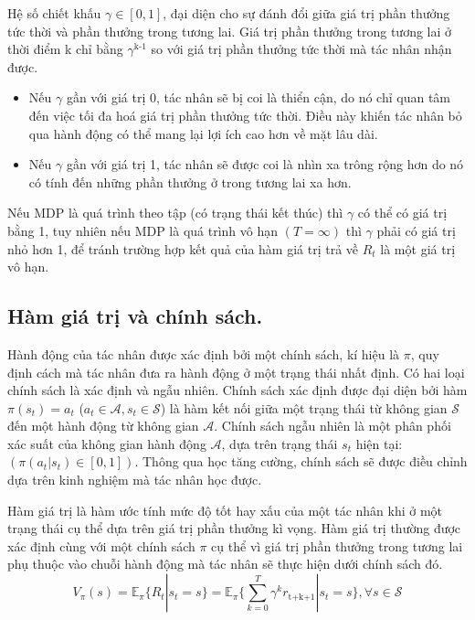 \documentclass{uetgraduation}
\begin{document}
Hệ số chiết khấu $\gamma \in [0, 1]$, đại diện cho sự đánh đổi giữa giá trị phần thưởng tức thời và phần thưởng trong tương lai. Giá trị phần thưởng trong tương lai ở thời điểm k chỉ bằng $\gamma^\text{k-1}$
so với giá trị phần thưởng tức thời mà tác nhân nhận được.
\begin{itemize}
    \item Nếu $\gamma$ gần với giá trị 0, tác nhân sẽ bị coi là thiển cận, do nó chỉ quan tâm đến việc tối đa hoá giá trị phần thưởng tức thời. Điều này khiến tác nhân bỏ qua hành động có thể mang lại lợi ích 
    cao hơn về mặt lâu dài.
    \item Nếu $\gamma$ gần với giá trị 1, tác nhân sẽ được coi là nhìn xa trông rộng hơn do nó có tính đến những phần thưởng ở trong tương lai xa hơn.
\end{itemize}

Nếu MDP là quá trình theo tập (có trạng thái kết thúc) thì $\gamma$ có thể có giá trị bằng 1, tuy nhiên nếu MDP là quá trình vô hạn $(T = \infty)$ thì $\gamma$ phải có giá trị nhỏ hơn 1, để tránh trường
hợp kết quả của hàm giá trị trả về $R_t$ là một giá trị vô hạn.

\subsection{Hàm giá trị và chính sách.}
Hành động của tác nhân được xác định bởi một chính sách, kí hiệu là $\pi$, quy định cách mà tác nhân đưa ra hành động ở một trạng thái nhất định. Có hai loại chính sách là xác định và ngẫu nhiên. Chính sách xác định được
đại diện bởi hàm $\pi(s_t) = a_t$ ($a_t \in \mathcal{A}, s_t \in \mathcal{S}$) là hàm kết nối giữa một trạng thái từ không gian $\mathcal{S}$ đến một hành động từ không gian $\mathcal{A}$. Chính sách
ngẫu nhiên là một phân phối xác suất của không gian hành động $\mathcal{A}$, dựa trên trạng thái $s_t$ hiện tại: $(\pi(a_t | s_t) \in [0, 1])$. Thông qua học tăng cường, chính sách sẽ được điều chỉnh
dựa trên kinh nghiệm mà tác nhân học được.

Hàm giá trị là hàm ước tính mức độ tốt hay xấu của một tác nhân khi ở một trạng thái cụ thể dựa trên giá trị phần thưởng kì vọng. Hàm giá trị thường được xác định cùng với một chính sách $\pi$ cụ thể vì giá trị phần
thưởng trong tương lai phụ thuộc vào chuỗi hành động mà tác nhân sẽ thực hiện dưới chính sách đó.
\[
V_\pi (s) = \mathbb{E}_\pi \{R_t | s_t = s\} = \mathbb{E}_\pi \{\sum_{k=0}^{T} \gamma^k r_\text{t+k+1} | s_t = s\}, \forall s \in \mathcal{S}
\]
\end{document}
